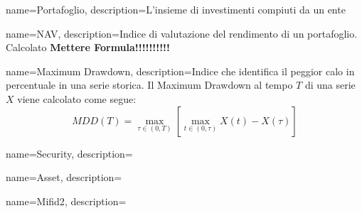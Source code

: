 {
    name=Portafoglio,
    description={L'insieme di investimenti compiuti da un ente}
}

{
  name=NAV,
  description={Indice di valutazione del rendimento di un portafoglio. Calcolato {\textbf{Mettere Formula!!!!!!!!!!}}}
}

{
  name={Maximum Drawdown},
  description={Indice che identifica il peggior calo in percentuale in una serie storica. Il Maximum Drawdown al tempo $T$ di una serie $X$ viene calcolato come segue:
  \begin{equation*}
      MDD(T) = \max_{\tau \in (0,T)}{[ \max_{t \in (0,\tau)} {X(t) - X(\tau)}]
      }
  \end{equation*}
  }
}

{
  name={Security},
  description={}
}

{
  name={Asset},
  description={}
}

{
  name={Mifid2},
  description={}
}